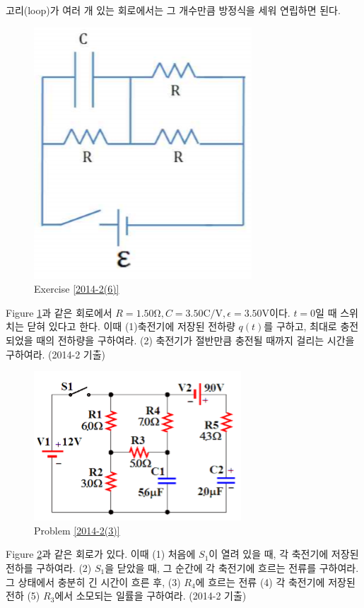  고리(loop)가 여러 개 있는 회로에서는 그 개수만큼 방정식을 세워 연립하면 된다.
\begin{figure}[h]
\centering\includegraphics[scale=0.5]{Pictures/2014-2(6).png}
\caption{Exercise \ref{2014-2(6)}}
\label{fig:2014-2(6)}
\end{figure} 
\begin{exercise}\label{2014-2(6)}
 Figure \ref{fig:2014-2(6)}과 같은 회로에서 $R=1.50\mathrm{\Omega}, C=3.50\mathrm{C/V}, \epsilon=3.50\mathrm{V}$이다. $t=0$일 때 스위치는 닫혀 있다고 한다. 이때 (1)축전기에 저장된 전하량 $q(t)$를 구하고, 최대로 충전되었을 때의 전하량을 구하여라. (2) 축전기가 절반만큼 충전될 때까지 걸리는 시간을 구하여라.
 (2014-2 기출)
 \end{exercise}

\begin{problem}\label{2014-2(3)}
\begin{figure}[h]
\centering\includegraphics[scale=0.9]{Pictures/2014-2(3).png}
\caption{Problem \ref{2014-2(3)}}
\label{fig:2014-2(3)}
\end{figure}
Figure \ref{fig:2014-2(3)}과 같은 회로가 있다. 이때
(1) 처음에 $S_1$이 열려 있을 때, 각 축전기에 저장된 전하를 구하여라. (2) $S_1$을 닫았을 때, 그 순간에 각 축전기에 흐르는 전류를 구하여라. 그 상태에서 충분히 긴 시간이 흐른 후, (3) $R_4$에 흐르는 전류 (4) 각 축전기에 저장된 전하 (5) $R_3$에서 소모되는 일률을 구하여라. (2014-2 기출)
\end{problem}

